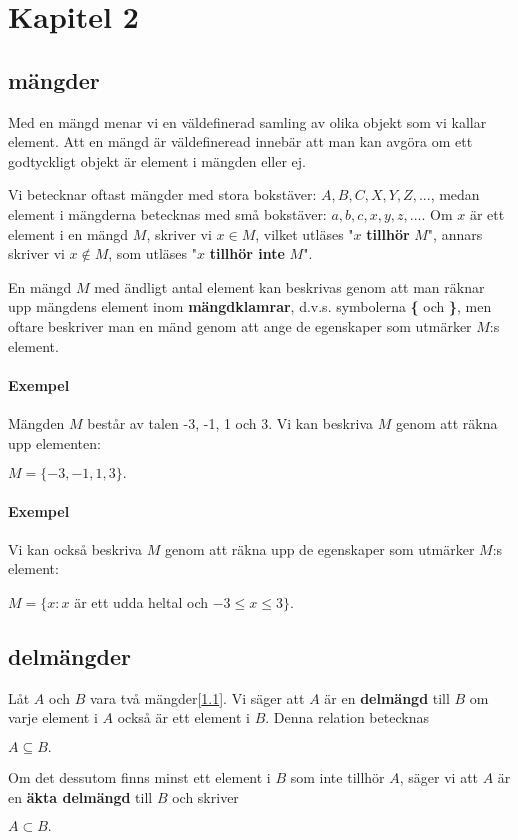 \section{Kapitel 2} 
\subsection{mängder}
    \label{mängder}
    \textbf{\cite{mängder}} Med en mängd menar vi en väldefinerad samling av olika objekt som vi kallar element. Att en mängd är väldefineread innebär att man kan avgöra om ett godtyckligt objekt är element i mängden eller ej.
    \par Vi betecknar oftast mängder med stora bokstäver: $A,B,C,X,Y,Z,...$, medan element i mängderna betecknas med små bokstäver: $a,b,c,x,y,z,...$. Om $x$ är ett element i en mängd $M$, skriver vi $x \in M$, vilket utläses "$x$ \textbf{tillhör} $M$", annars skriver vi $x \notin M$, som utläses "$x$ \textbf{tillhör inte} $M$".
    \par En mängd $M$ med ändligt antal element kan beskrivas genom att man räknar upp mängdens element inom \textbf{mängdklamrar}, d.v.s. symbolerna \textbf{\{} och \textbf{\}}, men oftare beskriver man en mänd genom att ange de egenskaper som utmärker $M$:s element.
        \paragraph{Exempel} Mängden $M$ består av talen -3, -1, 1 och 3. Vi kan beskriva $M$ genom att räkna upp elementen: 
            \begin{center}
                $M = \{-3, -1, 1, 3\}.$
            \end{center}
        \paragraph{Exempel} Vi kan också beskriva $M$ genom att räkna upp de egenskaper som utmärker $M$:s element:
            \begin{center}
                $M = \{ x:x$ är ett udda heltal och $-3 \leqslant x \leqslant 3 \}.$
            \end{center}
\subsection{delmängder}
    \label{delmängder}
    Låt $A$ och $B$ vara två mängder[\ref{mängder}]. Vi säger att $A$ är en \textbf{delmängd} till $B$ om varje element i $A$ också är ett element i $B$. Denna relation betecknas
        \begin{center}
            $A \subseteq B.$
        \end{center}
    Om det dessutom finns minst ett element i $B$ som inte tillhör $A$, säger vi att $A$ är en \textbf{äkta delmängd} till $B$ och skriver
        \begin{center}
            $A \subset B.$
        \end{center}
